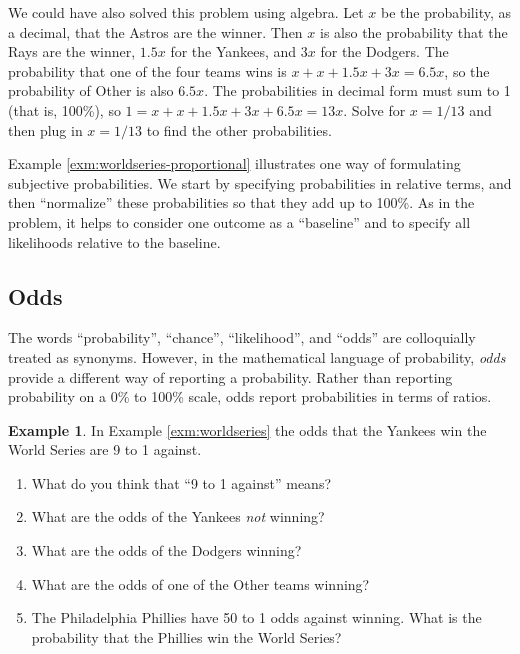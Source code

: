 \documentclass[
]{book}
\providecommand{\tightlist}{%
  \setlength{\itemsep}{0pt}\setlength{\parskip}{0pt}}
\theoremstyle{definition}
\theoremstyle{definition}
\newtheorem{example}{Example}[chapter]
\theoremstyle{definition}
\theoremstyle{remark}
\begin{document}
We could have also solved this problem using algebra. Let \(x\) be the probability, as a decimal, that the Astros are the winner. Then \(x\) is also the probability that the Rays are the winner, \(1.5x\) for the Yankees, and \(3x\) for the Dodgers. The probability that one of the four teams wins is \(x + x + 1.5x + 3x = 6.5x\), so the probability of Other is also \(6.5x\). The probabilities in decimal form must sum to 1 (that is, 100\%), so \(1 = x + x + 1.5x + 3x + 6.5x = 13x\). Solve for \(x=1/13\) and then plug in \(x=1/13\) to find the other probabilities.

Example \ref{exm:worldseries-proportional} illustrates one way of formulating subjective probabilities. We start by specifying probabilities in relative terms, and then ``normalize'' these probabilities so that they add up to 100\%. As in the problem, it helps to consider one outcome as a ``baseline'' and to specify all likelihoods relative to the baseline.

\hypertarget{odds}{%
\subsection{Odds}\label{odds}}

The words ``probability'', ``chance'', ``likelihood'', and ``odds'' are colloquially treated as synonyms. However, in the mathematical language of probability, \emph{odds} provide a different way of reporting a probability. Rather than reporting probability on a 0\% to 100\% scale, odds report probabilities in terms of ratios.

\begin{example}
\protect\hypertarget{exm:worldseries-odds}{}{\label{exm:worldseries-odds} }
In Example \ref{exm:worldseries} the odds that the Yankees win the World Series are 9 to 1 against.
\end{example}

\begin{enumerate}
\def\labelenumi{\arabic{enumi}.}
\tightlist
\item
  What do you think that ``9 to 1 against'' means?
\item
  What are the odds of the Yankees \emph{not} winning?
\item
  What are the odds of the Dodgers winning?
\item
  What are the odds of one of the Other teams winning?
\item
  The Philadelphia Phillies have 50 to 1 odds against winning. What is the probability that the Phillies win the World Series?
\end{enumerate}
\end{document}
